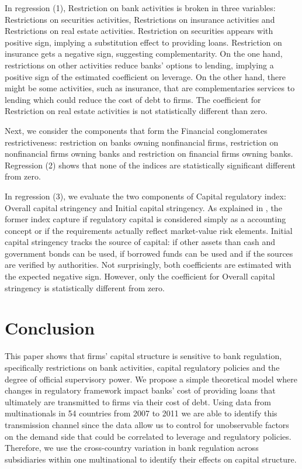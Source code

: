 \documentclass[12pt]{article}
\begin{document}
In regression (1), Restriction on bank activities is broken in three variables: Restrictions on securities activities, Restrictions on insurance activities and Restrictions on real estate activities. Restriction on securities appears with positive sign, implying a substitution effect to providing loans. Restriction on insurance gets a negative sign, suggesting complementarity. On the one hand, restrictions on other activities reduce banks' options to lending, implying a positive sign of the estimated coefficient on leverage. On the other hand, there might be some activities, such as insurance, that are complementaries services to lending which could reduce the cost of debt to firms. The coefficient for Restriction on real estate activities is not statistically different than zero. 

Next, we consider the components that form the Financial conglomerates restrictiveness: restriction on banks owning nonfinancial firms, restriction on nonfinancial firms owning banks and restriction on financial firms owning banks. Regression (2) shows that none of the indices are statistically significant different from zero. 

In regression (3), we evaluate the two components of Capital regulatory index: Overall capital stringency and Initial capital stringency.  As explained in \cite*{barth2001regulation}, the former index capture if regulatory capital is considered simply as a accounting concept or if the requirements actually reflect market-value risk elements. Initial capital stringency tracks the source of capital: if other assets than cash and government bonds can be used, if borrowed funds can be used and if the sources are verified by authorities. Not surprisingly, both coefficients are estimated with the expected negative sign. However, only the coefficient for Overall capital stringency is statistically different from zero.        
    	 
	\section{Conclusion} \label{sec:conclusion}
		
	This paper shows that firms' capital structure is sensitive to bank regulation, specifically restrictions on bank activities, capital regulatory policies and the degree of official supervisory power. We propose a simple theoretical model where changes in regulatory framework impact banks' cost of providing loans that ultimately are transmitted to firms via their cost of debt. Using data from multinationals in 54 countries from 2007 to 2011 we are able to identify this transmission channel since the data allow us to control for unobservable factors on the demand side that could be correlated to leverage and regulatory policies. Therefore, we use the cross-country variation in bank regulation across subsidiaries within one multinational to identify their effects on capital structure. 
	
\end{document}
